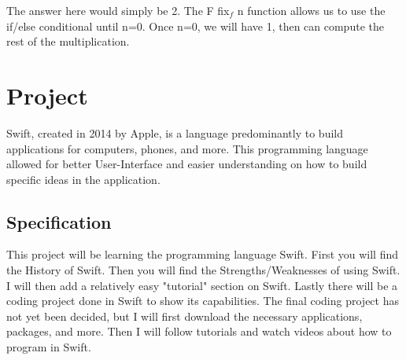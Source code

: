 \documentclass{article}
\theoremstyle{theorem}
\theoremstyle{definition}
\theoremstyle{remark}
\begin{document}
The answer here would simply be 2. The F fix$_f$ n function allows us to use the if/else conditional until n=0. Once n=0, we will have 1, then can compute the rest of the multiplication.



 
\section{Project}

Swift, created in 2014 by Apple, is a language predominantly to build applications for computers, phones, and more. This programming language allowed for better User-Interface and easier understanding on how to build specific ideas in the application. 
\subsection{Specification}
This project will be learning the programming language Swift. First you will find the History of Swift. Then you will find the Strengths/Weaknesses of using Swift. I will then add a relatively easy "tutorial" section on Swift. Lastly there will be a coding project done in Swift to show its capabilities. The final coding project has not yet been decided, but I will first download the necessary applications, packages, and more. Then I will follow tutorials and watch videos about how to program in Swift.
\end{document}
